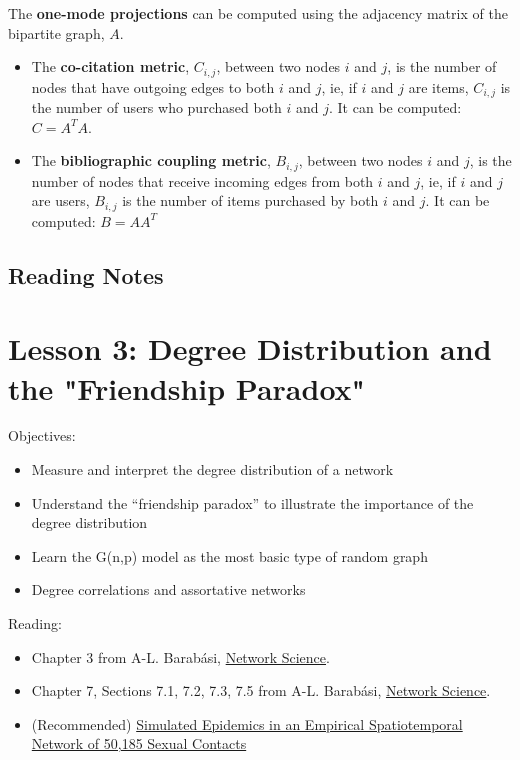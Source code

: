 \documentclass[11pt]{scrartcl} %
\begin{document}
The \textbf{one-mode projections} can be computed using the adjacency matrix of the bipartite graph, $A$. 
\begin{itemize}
	\item The \textbf{co-citation metric}, $C_{i,j}$, between two nodes $i$ and $j$, is the number of nodes that have outgoing edges to both $i$ and $j$, ie, if $i$ and $j$ are items, $C_{i,j}$ is the number of users who purchased both $i$ and $j$. It can be computed: $C=A^T A$.
	\item The \textbf{bibliographic coupling metric}, $B_{i,j}$, between two nodes $i$ and $j$, is the number of nodes that receive incoming edges from both $i$ and $j$, ie, if $i$ and $j$ are users, $B_{i,j}$ is the number of items purchased by both $i$ and $j$. It can be computed: $B=A A^T$
\end{itemize}



\subsection{Reading Notes}

\section{Lesson 3: Degree Distribution and the "Friendship Paradox"}

Objectives:
\begin{itemize}
	\item Measure and interpret the degree distribution of a network
	\item Understand the “friendship paradox” to illustrate the importance of the degree distribution 
	\item Learn the G(n,p) model as the most basic type of random graph
	\item Degree correlations and assortative networks
\end{itemize}

Reading:
\begin{itemize}
	\item Chapter 3 from A-L. Barabási, \href{http://networksciencebook.com/}{Network Science}.
	\item Chapter 7, Sections 7.1, 7.2, 7.3, 7.5 from A-L. Barabási, \href{http://networksciencebook.com/}{Network Science}.
	\item (Recommended) \href{http://www.ploscompbiol.org/article/info\%3Adoi\%2F10.1371\%2Fjournal.pcbi.1001109#s2}{Simulated Epidemics in an Empirical Spatiotemporal Network of 50,185 Sexual Contacts}
\end{itemize}
\end{document}
